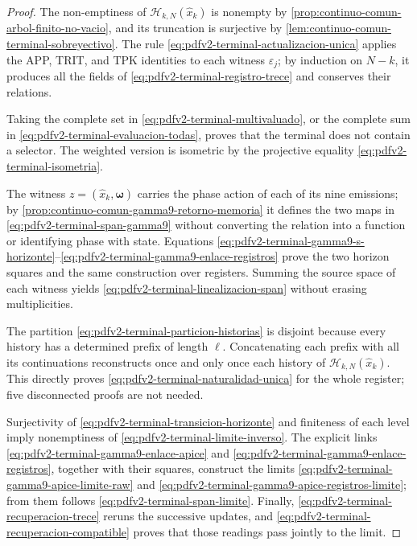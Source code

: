 \begin{proof}
The non-emptiness of
\(\mathscr H_{k,N}(\widehat x_k)\) is nonempty by
\cref{prop:continuo-comun-arbol-finito-no-vacio}, and its truncation is
surjective by \cref{lem:continuo-comun-terminal-sobreyectivo}. The rule
\eqref{eq:pdfv2-terminal-actualizacion-unica} applies the APP,
TRIT, and TPK identities to each witness \(\varepsilon_j\); by induction on
\(N-k\), it produces all the fields of
\eqref{eq:pdfv2-terminal-registro-trece} and conserves their relations.

Taking the complete set in
\eqref{eq:pdfv2-terminal-multivaluado}, or the complete sum in
\eqref{eq:pdfv2-terminal-evaluacion-todas}, proves that the terminal does not
contain a selector. The weighted version is isometric by the projective
equality \eqref{eq:pdfv2-terminal-isometria}.

The witness \(z=(\widehat x_k,\boldsymbol\omega)\) carries the phase action of each of its nine emissions; by \cref{prop:continuo-comun-gamma9-retorno-memoria} it defines the two maps in \eqref{eq:pdfv2-terminal-span-gamma9} without converting the relation into a function or identifying phase with state. Equations \eqref{eq:pdfv2-terminal-gamma9-s-horizonte}--\eqref{eq:pdfv2-terminal-gamma9-enlace-registros} prove the two horizon squares and the same construction over registers. Summing the source space of each witness yields \eqref{eq:pdfv2-terminal-linealizacion-span} without erasing multiplicities.

The partition
\eqref{eq:pdfv2-terminal-particion-historias} is disjoint because every
history has a determined prefix of length \(\ell\). Concatenating each
prefix with all its continuations reconstructs once and only once each
history of \(\mathscr H_{k,N}(\widehat x_k)\). This directly proves
\eqref{eq:pdfv2-terminal-naturalidad-unica} for the whole register; five disconnected proofs are not
needed.

Surjectivity of
\eqref{eq:pdfv2-terminal-transicion-horizonte} and finiteness of each level
imply nonemptiness of
\eqref{eq:pdfv2-terminal-limite-inverso}. The explicit links
\eqref{eq:pdfv2-terminal-gamma9-enlace-apice} and
\eqref{eq:pdfv2-terminal-gamma9-enlace-registros}, together with their squares,
construct the limits
\eqref{eq:pdfv2-terminal-gamma9-apice-limite-raw} and
\eqref{eq:pdfv2-terminal-gamma9-apice-registros-limite}; from them follows
\eqref{eq:pdfv2-terminal-span-limite}. Finally,
\eqref{eq:pdfv2-terminal-recuperacion-trece} reruns the
successive updates, and
\eqref{eq:pdfv2-terminal-recuperacion-compatible} proves that those
readings pass jointly to the limit.
\end{proof}

